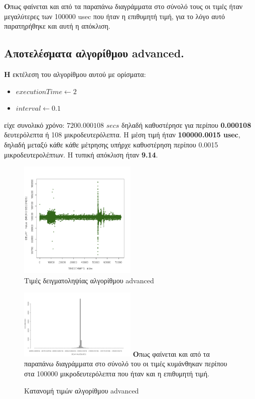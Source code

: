 \documentclass[12pt, a4paper]{article}
\begin{document}
\newpage

\justify
\textbf{Ο}πως φαίνεται και από τα παραπάνω διαγράμματα στο σύνολό τους οι τιμές ήταν μεγαλύτερες των 100000 \textlatin{usec} που ήταν η επιθυμητή τιμή, για το λόγο αυτό παρατηρήθηκε και αυτή η απόκλιση. 

\newpage
\subsection{Αποτελέσματα αλγορίθμου \textlatin{advanced}.}
\justify
\textbf{H} εκτέλεση του αλγορίθμου αυτού με ορίσματα:
\begin{itemize}
    \item $executionTime \longleftarrow 2$
    \item $interval \longleftarrow 0.1$
\end{itemize}
είχε συνολικό χρόνο: $7200.000108$ $secs$ δηλαδή καθυστέρησε για περίπου \textbf{0.000108} δευτερόλεπτα ή 108 μικροδευτερόλεπτα. Η μέση τιμή ήταν \textbf{100000.0015 \textlatin{usec}}, δηλαδή μεταξύ κάθε κάθε μέτρησης υπήρχε καθυστέρηση περίπου 0.0015 μικροδευτερολέπτων. Η τυπική απόκλιση ήταν \textbf{9.14}.


\begin{figure}[h]
\caption{Τιμές δειγματοληψίας αλγορίθμου \textlatin{advanced}}
\centering
\includegraphics[width=0.5\textwidth]{images/advanced.png}
\end{figure}
\begin{figure}[h]
\caption{Κατανομή τιμών αλγορίθμου \textlatin{advanced}}
\centering
\includegraphics[width=0.5\textwidth]{images/advanced_distribution.png}
\justify
\textbf{Ο}πως φαίνεται και από τα παραπάνω διαγράμματα στο σύνολό του οι τιμές κυμάνθηκαν περίπου στα 100000 μικροδευτερόλεπτα που ήταν και η επιθυμητή τιμή.
\end{figure}
\end{document}
